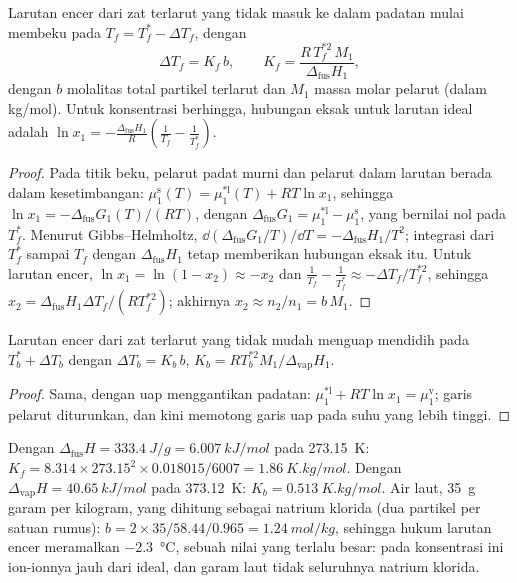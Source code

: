 \begin{theorem}\label{thm:b2:chemical-potential:cryoscopy}
Larutan encer dari zat terlarut yang tidak masuk ke dalam padatan mulai
membeku pada $T_f = T_f^* - \Delta T_f$, dengan
\[
  \Delta T_f = K_f\,b, \qquad K_f = \frac{R\,T_f^{*2}\,M_1}{\Delta_{\text{fus}}H_1} ,
\]
dengan $b$ molalitas total partikel terlarut dan $M_1$ massa molar pelarut
(dalam \unit{kg/mol}). Untuk konsentrasi berhingga, hubungan eksak untuk
larutan ideal adalah $\ln x_1 = -\frac{\Delta_{\text{fus}}H_1}{R}
\left(\frac{1}{T_f} - \frac{1}{T_f^*}\right)$.
\end{theorem}

\begin{proof}
Pada titik beku, pelarut padat murni dan pelarut dalam larutan berada
dalam kesetimbangan: $\mu_1^{\text{s}}(T) = \mu_1^{*\text{l}}(T) + RT\ln x_1$,
sehingga $\ln x_1 = -\Delta_{\text{fus}}G_1(T)/(RT)$, dengan
$\Delta_{\text{fus}}G_1 =
\mu_1^{*\text{l}} - \mu_1^{\text{s}}$, yang bernilai
nol pada $T_f^*$. Menurut Gibbs--Helmholtz,
$\dd(\Delta_{\text{fus}}G_1/T)/\dd T = -\Delta_{\text{fus}}H_1/T^2$;
integrasi dari $T_f^*$ sampai $T_f$ dengan $\Delta_{\text{fus}}H_1$ tetap
memberikan hubungan eksak itu. Untuk larutan encer,
$\ln x_1 = \ln(1 - x_2) \approx
-x_2$ dan
$\frac1{T_f} - \frac1{T_f^*} \approx -\Delta T_f/T_f^{*2}$, sehingga
$x_2 = \Delta_{\text{fus}}H_1\Delta T_f/(RT_f^{*2})$; akhirnya
$x_2 \approx
n_2/n_1 = b\,M_1$.
\end{proof}

\begin{proposition}\label{prop:b2:chemical-potential:ebullioscopy}
Larutan encer dari zat terlarut yang tidak mudah menguap mendidih pada
$T_b^* + \Delta T_b$ dengan $\Delta T_b = K_b\,b$,
$K_b = RT_b^{*2}M_1/\Delta_{\text{vap}}H_1$.
\end{proposition}

\begin{proof}
Sama, dengan uap menggantikan padatan: $\mu_1^{*\text{l}} +
RT\ln x_1 = \mu_1^{\text{v}}$; garis pelarut diturunkan, dan kini
memotong garis uap pada suhu yang lebih tinggi.
\end{proof}

\begin{example}[Air]\label{ex:b2:chemical-potential:water-constants}
Dengan $\Delta_{\text{fus}}H = \qty{333.4}{J/g} = \qty{6.007}{kJ/mol}$ pada
\qty{273.15}{K}: $K_f = 8.314 \times 273.15^2 \times 0.018015/6007 =
\qty{1.86}{K.kg/mol}$. Dengan $\Delta_{\text{vap}}H = \qty{40.65}{kJ/mol}$
pada \qty{373.12}{K}: $K_b = \qty{0.513}{K.kg/mol}$. Air laut, \qty{35}{g}
garam per kilogram, yang dihitung sebagai natrium klorida (dua partikel
per satuan rumus): $b = 2 \times 35/58.44/0.965 = \qty{1.24}{mol/kg}$,
sehingga hukum larutan encer meramalkan \qty{-2.3}{\celsius}, sebuah nilai
yang terlalu besar: pada konsentrasi ini ion-ionnya jauh dari ideal, dan
garam laut tidak seluruhnya natrium klorida.
\end{example}

